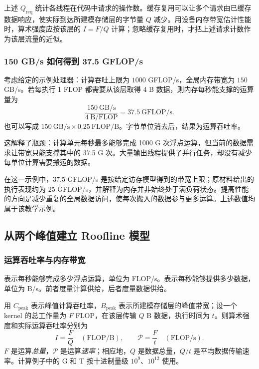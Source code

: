 \begin{keybox}[title={请求流量与设备内存流量}]
上述 $Q_{\mathrm{req}}$ 统计各线程在代码中请求的操作数。缓存复用可以让多个请求由已缓存数据响应，使实际到达所建模存储层的字节量 $Q$ 减少。用设备内存带宽估计性能时，算术强度应按该层的 $I=F/Q$ 计算；忽略缓存复用时，才把上述请求计数作为该层流量的近似。
\end{keybox}

\subsubsection{150 GB/s 如何得到 37.5 GFLOP/s}
考虑给定的示例处理器：计算吞吐上限为 $1000$ GFLOP/s，全局内存带宽为 $150$ GB/s。若每执行 1 FLOP 都需要从该层取得 4 B 数据，则内存每秒能支撑的运算量为
\begin{equation}
\frac{150\ \mathrm{GB/s}}{4\ \mathrm{B/FLOP}}
=37.5\ \mathrm{GFLOP/s}.
\label{l5:eq:150gb-example}
\end{equation}
也可以写成 $150\ \mathrm{GB/s}\times0.25\ \mathrm{FLOP/B}$。字节单位消去后，结果为运算吞吐率。

这解释了瓶颈：计算单元每秒最多能够完成 1000 G 次浮点运算，但当前的数据需求让带宽只能支撑其中的 37.5 G 次。大量输出线程提供了并行任务，却没有减少每单位计算需要搬运的数据。

在这一示例中，37.5 GFLOP/s 是按给定访存模型得到的带宽上限；原材料给出的执行表现约为 25 GFLOP/s，并解释为内存并非始终处于满负荷状态。提高性能的方向是减少重复的全局数据访问，使每次搬入的数据参与更多运算。上述数值均属于该教学示例。

\subsection{从两个峰值建立 Roofline 模型}

\subsubsection{运算吞吐率与内存带宽}
表示每秒能够完成多少浮点运算，单位为 FLOP/s。表示每秒能够提供多少数据，单位为 B/s。前者度量计算供给，后者度量数据供给。

用 $C_{\mathrm{peak}}$ 表示峰值计算吞吐率，$B_{\mathrm{peak}}$ 表示所建模存储层的峰值带宽；设一个 kernel 的总工作量为 $F$ FLOP，在该层传输 $Q$ B 数据，执行时间为 $t$。则算术强度和实际运算吞吐率分别为
\begin{equation}
I=\frac FQ\quad(\mathrm{FLOP/B}),\qquad
\mathcal P=\frac Ft\quad(\mathrm{FLOP/s}).
\label{l5:eq:metric-defs}
\end{equation}
$F$ 是运算\emph{总量}，$\mathcal P$ 是运算\emph{速率}；相应地，$Q$ 是数据总量，$Q/t$ 是平均数据传输速率。计算例子中的 G 和 T 按十进制量级 $10^9$、$10^{12}$ 使用。

